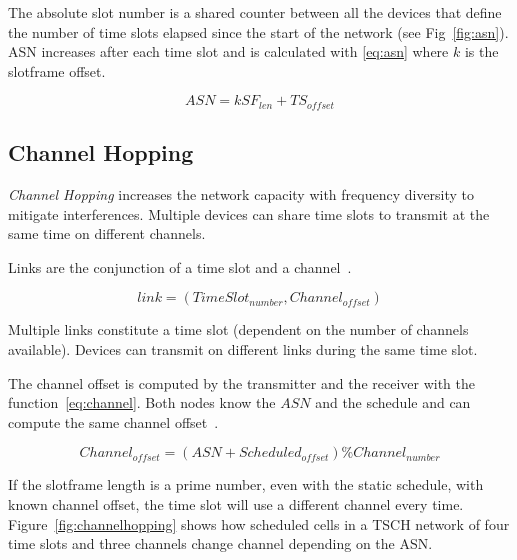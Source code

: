 The absolute slot number is a shared counter between all the devices that
define the number of time slots elapsed since the start of the
network (see Fig~\ref{fig:asn}).
ASN increases after each time slot and is calculated with \ref{eq:asn} where $k$
is the slotframe offset.

\begin{equation}
  \label{eq:asn}
  ASN = k SF_{len} + TS_{offset}
\end{equation}



\subsection{Channel Hopping}

\emph{Channel Hopping} increases the network capacity with frequency diversity
to mitigate interferences.
Multiple devices can share time slots to transmit at the same time on different
channels.

Links are the conjunction of a time slot and a channel~\cite{Chen2013PerformanceAO}.

\begin{equation}
  \label{eq:links}
  link = (TimeSlot_{number}, Channel_{offset})
\end{equation}

Multiple links constitute a time slot (dependent on the number of channels
available). Devices can transmit on different links during the same time slot.


The channel offset is computed by the transmitter and the receiver with the
function~\ref{eq:channel}. Both nodes know the $ASN$ and the schedule and can
compute the same channel offset~\cite{rfc7554}.

\begin{equation}
  \label{eq:channel}
  Channel_{offset} = (ASN + Scheduled_{offset}) \% Channel_{number}
\end{equation}

If the slotframe length is a prime number, even with the static schedule,
with known channel offset, the time slot will use a different channel every time.
Figure~\ref{fig:channelhopping} shows how scheduled cells in a TSCH network of
four time slots and three channels change channel depending on the ASN.



